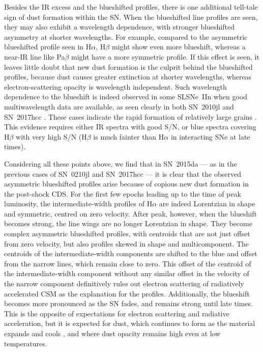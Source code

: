 \documentclass[fleqn,usenatbib,useAMS]{mnras}
\begin{document}

Besides the IR excess and the blueshifted profiles, there is one
additional tell-tale sign of dust formation within the SN.  When the
blueshifted line profiles are seen, they may also exhibit a wavelength
dependence, with stronger blueshifted asymmetry at shorter
wavelengths.  For example, compared to the asymmetric blueshifted
profile seen in H$\alpha$, H$\beta$ might show even more
blueshift, whereas a near-IR line like Pa$\beta$ might have a more
symmetric profile.  If this effect is seen, it leaves little doubt that
new dust formation is the culprit behind the blueshifted profiles,
because dust causes greater extinction at shorter wavelengths, whereas
electron-scattering opacity is wavelength independent.  Such
wavelength dependence to the blueshift is indeed observed in some SLSNe~IIn
when good multiwavelength data are available, as seen clearly in both
SN~2010jl \citep{smith12,maeda13,gall14} and SN~2017hcc \citep{smith20}.  These cases indicate the rapid formation of relatively large grains \citep{gall14,smith20}.  This
evidence requires
either IR spectra with good S/N, or blue spectra covering
H$\beta$ with very high S/N (H$\beta$ is much fainter than
H$\alpha$ in interacting SNe at late times).

Considering all these points above, we find that in SN~2015da ---
as in the previous cases of SN~0210jl and SN~2017hcc --- it is clear
that the observed asymmetric blueshifted profiles arise because of
copious new dust formation in the post-shock CDS.  For the first few
epochs leading up to the time of peak luminosity, the
intermediate-width profiles of H$\alpha$ are indeed Lorentzian in
shape and symmetric, centred on zero velocity.  After peak, however,
when the blueshift becomes strong, the line wings are no longer
Lorentzian in shape.  They become complex asymmetric blueshifted
profiles, with centroids that are not just offset from zero velocity,
but also profiles skewed in shape and multicomponent.  The
centroids of the intermediate-width components are shifted to the blue
and offset from the narrow lines, which remain close to zero.  This offset of the centroid of the
intermediate-width component without any similar offset in the
velocity of the narrow component definitively rules out electron
scattering of radiatively accelerated CSM as the explanation for
the profiles.  Additionally, the blueshift becomes more pronounced as
the SN fades, and remains strong until late times.  This is the
opposite of expectations for electron scattering and radiative
acceleration, but it is expected for dust, which continues to form as
the material expands and cools \citep{gall14,li22}, and where dust opacity remains high
even at low temperatures.
\end{document}
